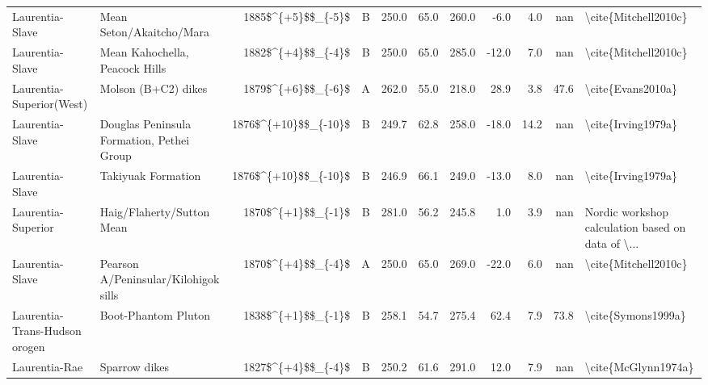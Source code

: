 \begin{longtable}{p{1 in}p{1 in}rrrrrrrr}
               Laurentia-Slave &                         Mean Seton/Akaitcho/Mara &     1885\$\textasciicircum \{+5\}\$\$\_\{-5\}\$ &      B &     250.0 &      65.0 & 260.0 &  -6.0 &       4.0 &         nan &                               \textbackslash cite\{Mitchell2010c\} \\
               Laurentia-Slave &                   Mean Kahochella, Peacock Hills &     1882\$\textasciicircum \{+4\}\$\$\_\{-4\}\$ &      B &     250.0 &      65.0 & 285.0 & -12.0 &       7.0 &         nan &                               \textbackslash cite\{Mitchell2010c\} \\
      Laurentia-Superior(West) &                              Molson (B+C2) dikes &     1879\$\textasciicircum \{+6\}\$\$\_\{-6\}\$ &      A &     262.0 &      55.0 & 218.0 &  28.9 &       3.8 &        47.6 &                                  \textbackslash cite\{Evans2010a\} \\
               Laurentia-Slave &        Douglas Peninsula Formation, Pethei Group &   1876\$\textasciicircum \{+10\}\$\$\_\{-10\}\$ &      B &     249.7 &      62.8 & 258.0 & -18.0 &      14.2 &         nan &                                 \textbackslash cite\{Irving1979a\} \\
               Laurentia-Slave &                               Takiyuak Formation &   1876\$\textasciicircum \{+10\}\$\$\_\{-10\}\$ &      B &     246.9 &      66.1 & 249.0 & -13.0 &       8.0 &         nan &                                 \textbackslash cite\{Irving1979a\} \\
            Laurentia-Superior &                       Haig/Flaherty/Sutton Mean  &     1870\$\textasciicircum \{+1\}\$\$\_\{-1\}\$ &      B &     281.0 &      56.2 & 245.8 &   1.0 &       3.9 &         nan &  Nordic workshop calculation based on data of \textbackslash ... \\
               Laurentia-Slave &             Pearson A/Peninsular/Kilohigok sills &     1870\$\textasciicircum \{+4\}\$\$\_\{-4\}\$ &      A &     250.0 &      65.0 & 269.0 & -22.0 &       6.0 &         nan &                               \textbackslash cite\{Mitchell2010c\} \\
 Laurentia-Trans-Hudson orogen &                              Boot-Phantom Pluton &     1838\$\textasciicircum \{+1\}\$\$\_\{-1\}\$ &      B &     258.1 &      54.7 & 275.4 &  62.4 &       7.9 &        73.8 &                                 \textbackslash cite\{Symons1999a\} \\
                 Laurentia-Rae &                                    Sparrow dikes &     1827\$\textasciicircum \{+4\}\$\$\_\{-4\}\$ &      B &     250.2 &      61.6 & 291.0 &  12.0 &       7.9 &         nan &                                \textbackslash cite\{McGlynn1974a\} \\

\end{longtable}
